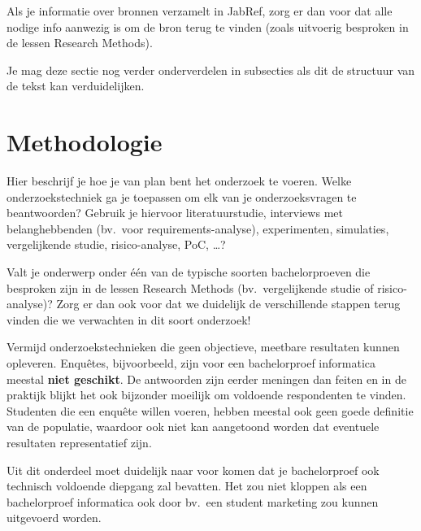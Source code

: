 Als je informatie over bronnen verzamelt in JabRef, zorg er dan voor dat alle nodige info aanwezig is om de bron terug te vinden (zoals uitvoerig besproken in de lessen Research Methods).


Je mag deze sectie nog verder onderverdelen in subsecties als dit de structuur van de tekst kan verduidelijken.

\section{Methodologie}%
\label{sec:methodologie}

Hier beschrijf je hoe je van plan bent het onderzoek te voeren. Welke onderzoekstechniek ga je toepassen om elk van je onderzoeksvragen te beantwoorden? Gebruik je hiervoor literatuurstudie, interviews met belanghebbenden (bv.~voor requirements-analyse), experimenten, simulaties, vergelijkende studie, risico-analyse, PoC, \ldots?

Valt je onderwerp onder één van de typische soorten bachelorproeven die besproken zijn in de lessen Research Methods (bv.\ vergelijkende studie of risico-analyse)? Zorg er dan ook voor dat we duidelijk de verschillende stappen terug vinden die we verwachten in dit soort onderzoek!

Vermijd onderzoekstechnieken die geen objectieve, meetbare resultaten kunnen opleveren. Enquêtes, bijvoorbeeld, zijn voor een bachelorproef informatica meestal \textbf{niet geschikt}. De antwoorden zijn eerder meningen dan feiten en in de praktijk blijkt het ook bijzonder moeilijk om voldoende respondenten te vinden. Studenten die een enquête willen voeren, hebben meestal ook geen goede definitie van de populatie, waardoor ook niet kan aangetoond worden dat eventuele resultaten representatief zijn.

Uit dit onderdeel moet duidelijk naar voor komen dat je bachelorproef ook technisch voldoen\-de diepgang zal bevatten. Het zou niet kloppen als een bachelorproef informatica ook door bv.\ een student marketing zou kunnen uitgevoerd worden.

